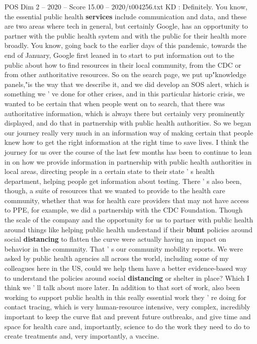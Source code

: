 \begin{textsample}{POS Dim 2 – 2020 – Score 15.00 – 2020/t004256.txt}
KD : Definitely.
You know, the essential public health \textbf{services} include communication and data, and these are two areas where tech in general, but certainly Google, has an opportunity to partner with the public health system and with the public for their health more broadly.
You know, going back to the earlier days of this pandemic, towards the end of January, Google first leaned in to start to put information out to the public about how to find resources in their local community, from the CDC or from other authoritative resources.
So on the search page, we put up"knowledge panels,"is the way that we describe it, and we did develop an SOS alert, which is something we ' ve done for other crises, and in this particular historic crisis, we wanted to be certain that when people went on to search, that there was authoritative information, which is always there but certainly very prominently displayed, and do that in partnership with public health authorities.
So we began our journey really very much in an information way of making certain that people knew how to get the right information at the right time to save lives.
I think the journey for us over the course of the last few months has been to continue to lean in on how we provide information in partnership with public health authorities in local areas, directing people in a certain state to their state ' s health department, helping people get information about testing.
There ' s also been, though, a suite of resources that we wanted to provide to the health care community, whether that was for health care providers that may not have access to PPE, for example, we did a partnership with the CDC Foundation.
Though the scale of the company and the opportunity for us to partner with public health around things like helping public health understand if their \textbf{blunt} policies around social \textbf{distancing} to flatten the curve were actually having an impact on behavior in the community.
That ' s our community mobility reports.
We were asked by public health agencies all across the world, including some of my colleagues here in the US, could we help them have a better evidence-based way to understand the policies around social \textbf{distancing} or shelter in place?
Which I think we ' ll talk about more later.
In addition to that sort of work, also been working to support public health in this really essential work they ' re doing for contact tracing, which is very human-resource intensive, very complex, incredibly important to keep the curve flat and prevent future outbreaks, and give time and space for health care and, importantly, science to do the work they need to do to create treatments and, very importantly, a vaccine.

\end{textsample}
